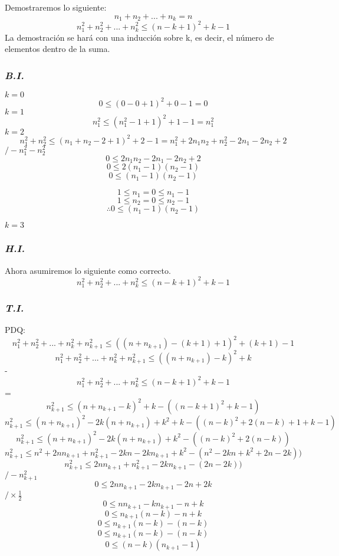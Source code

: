 \documentclass[../doc.tex]{subfiles}
\begin{document}
Demostraremos lo siguiente:
\[ n_1 + n_2 + ... + n_k = n \]
\[ n_1^2 + n_2^2 + ... + n_k^2 \leq (n-k+1)^2 + k -1\]
La demostración se hará con una inducción sobre k, es decir, el número de 
elementos dentro de la suma.

\subsubsection*{\emph{B.I.}}
$k=0$
\[0 \leq (0 - 0 +1)^2 + 0 -1 = 0\]
$k=1$
\[ n_1^2 \leq (n_1^2 - 1 + 1)^2 + 1 - 1 = n_1^2\]
$k=2$
\[ n_1^2 + n_2^2 \leq (n_1 + n_2 - 2 + 1)^2 + 2 -1 = n_1^2 + 2n_1n_2+n_2^2-2n_1-2n_2+2 \]
\hspace*{0pt}\hfill $/ - n_1^2 - n_2^2$
\[ 0 \leq  2n_1n_2-2n_1-2n_2+2 \]
\[ 0 \leq 2(n_1 - 1)(n_2 - 1) \]
\[ 0 \leq (n_1 - 1)(n_2 -1) \]

\[ 1 \leq n_1 = 0 \leq n_1 - 1  \]
\[ 1 \leq n_2 = 0 \leq n_2 -1  \]
\[ \therefore  0 \leq (n_1 - 1)(n_2 -1)\]

$k=3$
\subsubsection*{\emph{H.I.}}
Ahora asumiremos lo siguiente como correcto.
\[ n_1^2 + n_2^2 + ... + n_k^2 \leq (n-k+1)^2 + k -1\]


\subsubsection*{\emph{T.I.}}
PDQ:
\[ n_1^2 + n_2^2 + ... + n_k^2 + n_{k+1}^2 \leq ((n + n_{k+1}) - (k+1) + 1)^2 + (k+1)-1 \]
\[ n_1^2 + n_2^2 + ... + n_k^2 + n_{k+1}^2 \leq ((n + n_{k+1}) - k)^2 + k \]
-\[   n_1^2 + n_2^2 + ... + n_k^2 \leq (n-k+1)^2 + k -1\]
=\[ n_{k+1}^2 \leq (n+n_{k+1} - k)^2 + k - ((n-k+1)^2 + k -1) \]
\[ n_{k+1}^2 \leq (n+n_{k+1})^2 - 2k(n+n_{k+1}) + k^2 + k - ((n-k)^2 + 2(n-k) + 1+ k -1) \]
\[ n_{k+1}^2 \leq (n+n_{k+1})^2 - 2k(n+n_{k+1}) + k^2 - ((n-k)^2 + 2(n-k)) \]
\[ n_{k+1}^2 \leq n^2 + 2nn_{k+1} + n_{k+1}^2 - 2kn -2kn_{k+1} + k^2  - (n^2 - 2kn +k^2 + 2n - 2k)) \]
\[ n_{k+1}^2 \leq 2nn_{k+1} + n_{k+1}^2 -2kn_{k+1} - ( 2n - 2k)) \]
\hspace*{0pt}\hfill $/ -n_{k+1}^2 $
\[ 0 \leq 2nn_{k+1} -2kn_{k+1} - 2n + 2k \]
\hspace*{0pt}\hfill $/ \times\frac{1}{2} $
\[ 0 \leq nn_{k+1} -kn_{k+1} - n + k \]
\[ 0 \leq n_{k+1}(n-k) - n + k \]
\[ 0 \leq n_{k+1}(n-k) - (n - k) \]
\[ 0 \leq n_{k+1}(n-k) - (n - k) \]
\[ 0 \leq (n-k)( n_{k+1}-1) \]
\end{document}
